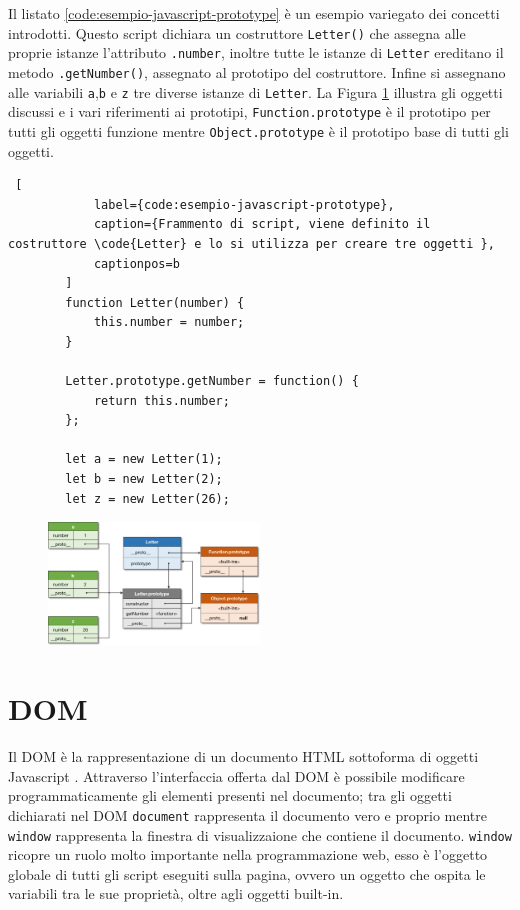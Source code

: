 \documentclass{sapthesis}
\newcommand{\code}[1]{\texttt{#1}}
\newcommand{\method}[1]{\code{.#1()}}
\newcommand{\attr}[1]{\code{.#1}}
\newcommand{\JS}{Javascript }
\begin{document}
        Il listato \ref{code:esempio-javascript-prototype} è un esempio variegato dei concetti introdotti.
        Questo script dichiara un costruttore \code{Letter()} che assegna alle proprie istanze l'attributo \attr{number},
        inoltre tutte le istanze di \code{Letter} ereditano il metodo \method{getNumber}, assegnato al prototipo del costruttore.
        Infine si assegnano alle variabili \code{a},\code{b} e \code{z} tre diverse istanze di \code{Letter}.
        La Figura \ref{fig:javascript-prototype} illustra gli oggetti discussi e i vari riferimenti ai prototipi, \code{Function.prototype}
        è il prototipo per tutti gli oggetti funzione mentre \code{Object.prototype} è il prototipo base di tutti gli oggetti.

        \begin{lstlisting} [
            label={code:esempio-javascript-prototype},
            caption={Frammento di script, viene definito il costruttore \code{Letter} e lo si utilizza per creare tre oggetti },
            captionpos=b
        ]
        function Letter(number) {
            this.number = number;
        }
        
        Letter.prototype.getNumber = function() {
            return this.number;
        };
        
        let a = new Letter(1);
        let b = new Letter(2);
        let z = new Letter(26);
        \end{lstlisting}
        
        \begin{figure}[ht]
            \centering                                                  
            \includegraphics[width=0.5\textwidth]{javascript-constructor.png}
            \caption{}
            \label{fig:javascript-prototype}  
        \end{figure}

    \section{DOM}
    \label{dom}
        Il DOM è la rappresentazione di un documento HTML sottoforma di oggetti \JS \cite{dom-introduction}. 
        Attraverso l'interfaccia offerta dal DOM è possibile modificare programmaticamente gli elementi presenti
        nel documento; tra gli oggetti dichiarati nel DOM \code{document} rappresenta il documento vero e proprio
        mentre \code{window} rappresenta la finestra di visualizzaione che contiene il documento.
        \code{window} ricopre un ruolo molto importante nella programmazione web, esso è l'oggetto globale 
        di tutti gli script eseguiti sulla pagina, ovvero un oggetto che ospita le variabili tra le
        sue proprietà, oltre agli oggetti built-in.
\end{document}
